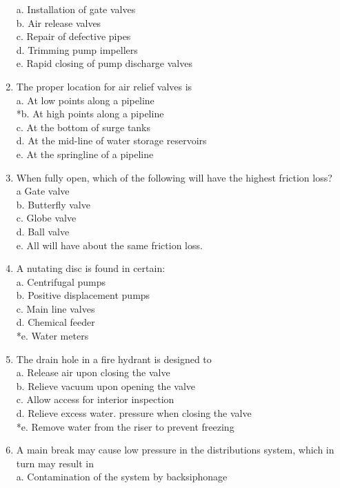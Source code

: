\begin{enumerate}[1.]
a. Installation of gate valves\\
b. Air release valves\\
c. Repair of defective pipes\\
d. Trimming pump impellers\\
e. Rapid closing of pump discharge valves\\
\item The proper location for air relief valves is\\
a. At low points along a pipeline\\
*b. At high points along a pipeline\\
c. At the bottom of surge tanks\\
d. At the mid-line of water storage reservoirs\\
e. At the springline of a pipeline\\
\item When fully open, which of the following will have the highest friction loss?\\
a Gate valve\\
b. Butterfly valve\\
c. Globe valve\\
d. Ball valve\\
e. All will have about the same friction loss.\\
\item A nutating disc is found in certain:\\
a. Centrifugal pumps\\
b. Positive displacement pumps\\
c. Main line valves\\
d. Chemical feeder\\
*e. Water meters\\
\item The drain hole in a fire hydrant is designed to\\
a. Release air upon closing the valve\\
b. Relieve vacuum upon opening the valve\\
c. Allow access for interior inspection\\
d. Relieve excess water. pressure when closing the valve\\
*e. Remove water from the riser to prevent freezing\\
\item A main break may cause low pressure in the distributions system, which in turn may result in\\
a. Contamination of the system by backsiphonage\\

\end{enumerate}

